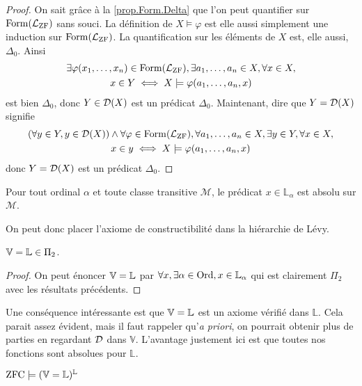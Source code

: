 \begin{proof}
  On sait grâce à la \cref{prop.Form.Delta} que l'on peut quantifier
  sur $\operatorname{Form}(\mathcal L_{\operatorname{ZF}})$ sans souci. La définition de
  $X\models \varphi$ est elle aussi simplement une induction sur
  $\operatorname{Form}(\mathcal L_{\operatorname{ZF}})$. La quantification sur les éléments de $X$ est,
  elle aussi, $\Delta_0$. Ainsi
  \begin{multline*}
    \exists \varphi(x_1,\ldots,x_n)\in\operatorname{Form}(\mathcal L_{\operatorname{ZF}}),
    \exists a_1,\ldots,a_n\in X, \forall x\in X, \\
    x\in Y \iff X\models \varphi(a_1,\ldots,a_n,x)
  \end{multline*}
  est bien $\Delta_0$, donc $Y\in \mathcal{D}(X)$ est un prédicat $\Delta_0$.
  Maintenant, dire que $Y = \mathcal{D}(X)$ signifie
  \begin{multline*}
    (\forall y \in Y, y \in \mathcal{D}(X)) \land
    \forall \varphi\in\operatorname{Form}(\mathcal L_{\operatorname{ZF}}),
    \forall a_1,\ldots,a_n\in X, \exists y \in Y, \forall x \in X,\\
    x \in y \iff X\models \varphi(a_1,\ldots,a_n,x)
  \end{multline*}
  donc $Y = \mathcal{D}(X)$ est un prédicat $\Delta_0$.
\end{proof}

\begin{corollary}
  Pour tout ordinal $\alpha$ et toute classe transitive $\mathcal M$, le
  prédicat $x\in \mathbb L_{\alpha}$ est absolu sur $\mathcal M$.
\end{corollary}

On peut donc placer l'axiome de constructibilité dans la hiérarchie de Lévy.

\begin{proposition}
  $\mathbb V = \mathbb L \in \Pi_2$.
\end{proposition}

\begin{proof}
  On peut énoncer $\mathbb V = \mathbb L$ par
  $\forall x, \exists \alpha \in \operatorname{Ord}, x\in \mathbb L_\alpha$ qui est clairement
  $\Pi_2$ avec les résultats précédents.
\end{proof}

Une conséquence intéressante est que $\mathbb V = \mathbb L$ est un axiome vérifié dans
$\mathbb L$. Cela parait assez évident, mais il faut rappeler
qu'\textit{a priori}, on pourrait obtenir plus de parties en regardant
$\mathcal{D}$ dans $\mathbb V$. L'avantage justement ici est que toutes nos
fonctions sont absolues pour $\mathbb L$. 

\begin{theorem}
  $\operatorname{ZFC}\models (\mathbb V = \mathbb L)^{\mathbb L}$
\end{theorem}

